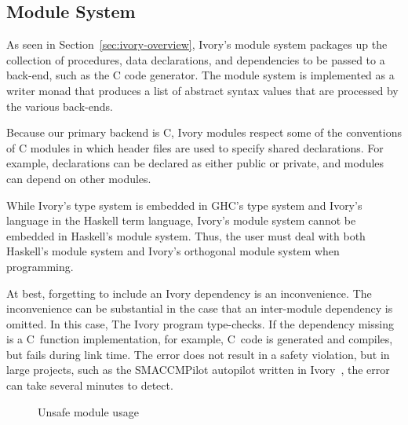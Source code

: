 \subsection{Module System}

As seen in Section~\ref{sec:ivory-overview}, Ivory's module system packages up
the collection of procedures, data declarations, and dependencies to be passed
to a back-end, such as the C code generator. The module system is implemented as
a writer monad that produces a list of abstract syntax values that are processed
by the various back-ends.

Because our primary backend is C, Ivory modules respect some of the conventions
of C modules in which header files are used to specify shared declarations. For
example, declarations can be declared as either public or private, and modules
can depend on other modules.

While Ivory's type system is embedded in GHC's type system and Ivory's language
in the Haskell term language, Ivory's module system cannot be embedded in
Haskell's module system. Thus, the user must deal with both Haskell's module
system and Ivory's orthogonal module system when programming.

At best, forgetting to include an Ivory dependency is an inconvenience. The
inconvenience can be substantial in the case that an inter-module dependency is
omitted. In this case, The Ivory program type-checks. If the dependency missing
is a C~function implementation, for example, C~code is generated and compiles,
but fails during link time. The error does not result in a safety violation, but
in large projects, such as the SMACCMPilot autopilot written in Ivory~\cite{},
the error can take several minutes to detect.

\begin{figure}[h]
\caption{Unsafe module usage}
\label{fig:unsafe-module}
\end{figure}

